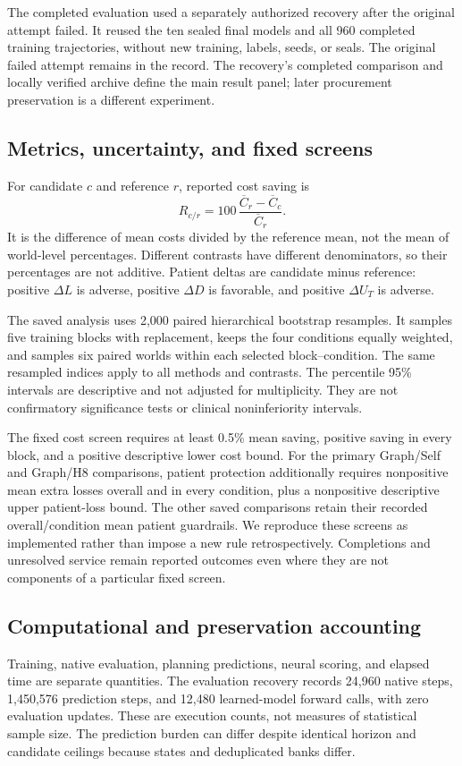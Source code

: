 \documentclass[preprint,12pt]{elsarticle}
\begin{document}
The completed evaluation used a separately authorized recovery after the
original attempt failed. It reused the ten sealed final models and all 960
completed training trajectories, without new training, labels, seeds, or seals.
The original failed attempt remains in the record. The recovery's completed
comparison and locally verified archive define the main result panel; later
procurement preservation is a different experiment.

\subsection{Metrics, uncertainty, and fixed screens}
For candidate $c$ and reference $r$, reported cost saving is
\begin{equation}
 R_{c/r}=100\,\frac{\overline C_r-\overline C_c}{\overline C_r}.
 \label{eq:saving}
\end{equation}
It is the difference of mean costs divided by the reference mean, not the mean
of world-level percentages. Different contrasts have different denominators,
so their percentages are not additive. Patient deltas are candidate minus
reference: positive $\Delta L$ is adverse, positive $\Delta D$ is favorable,
and positive $\Delta U_T$ is adverse.

The saved analysis uses 2,000 paired hierarchical bootstrap resamples. It samples
five training blocks with replacement, keeps the four conditions equally
weighted, and samples six paired worlds within each selected block--condition.
The same resampled indices apply to all methods and contrasts. The percentile
95\% intervals are descriptive and not adjusted for multiplicity. They are
not confirmatory significance tests or clinical noninferiority intervals.

The fixed cost screen requires at least 0.5\% mean saving, positive saving in
every block, and a positive descriptive lower cost bound. For the primary
Graph/Self and Graph/H8 comparisons, patient protection additionally requires
nonpositive mean extra losses overall and in every condition, plus a
nonpositive descriptive upper patient-loss bound. The other saved comparisons
retain their recorded overall/condition mean patient guardrails. We reproduce
these screens as implemented rather than impose a new rule retrospectively.
Completions and unresolved service remain reported outcomes even where they
are not components of a particular fixed screen.

\subsection{Computational and preservation accounting}
Training, native evaluation, planning predictions, neural scoring, and elapsed
time are separate quantities. The evaluation recovery records 24,960 native
steps, 1,450,576 prediction steps, and 12,480 learned-model forward calls, with
zero evaluation updates. These are execution counts, not measures of statistical
sample size. The prediction burden can differ despite identical horizon and
candidate ceilings because states and deduplicated banks differ.
\end{document}
